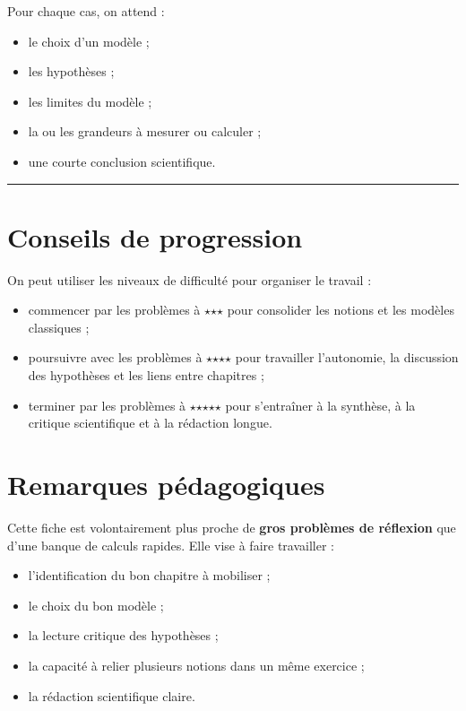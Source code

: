 \documentclass[11pt,a4paper]{article}
\newcommand{\etoile}{\ensuremath{\star}}
\begin{document}
Pour chaque cas, on attend :
\begin{itemize}[leftmargin=1.5em]
    \item le choix d'un modèle ;
    \item les hypothèses ;
    \item les limites du modèle ;
    \item la ou les grandeurs à mesurer ou calculer ;
    \item une courte conclusion scientifique.
\end{itemize}

\hrule

\section*{Conseils de progression}

On peut utiliser les niveaux de difficulté pour organiser le travail :
\begin{itemize}[leftmargin=1.5em]
    \item commencer par les problèmes à \etoile\etoile\etoile{} pour consolider les notions et les modèles classiques ;
    \item poursuivre avec les problèmes à \etoile\etoile\etoile\etoile{} pour travailler l'autonomie, la discussion des hypothèses et les liens entre chapitres ;
    \item terminer par les problèmes à \etoile\etoile\etoile\etoile\etoile{} pour s'entraîner à la synthèse, à la critique scientifique et à la rédaction longue.
\end{itemize}

\section*{Remarques pédagogiques}

Cette fiche est volontairement plus proche de \textbf{gros problèmes de réflexion} que d'une banque de calculs rapides. Elle vise à faire travailler :
\begin{itemize}[leftmargin=1.5em]
    \item l'identification du bon chapitre à mobiliser ;
    \item le choix du bon modèle ;
    \item la lecture critique des hypothèses ;
    \item la capacité à relier plusieurs notions dans un même exercice ;
    \item la rédaction scientifique claire.
\end{itemize}
\end{document}
